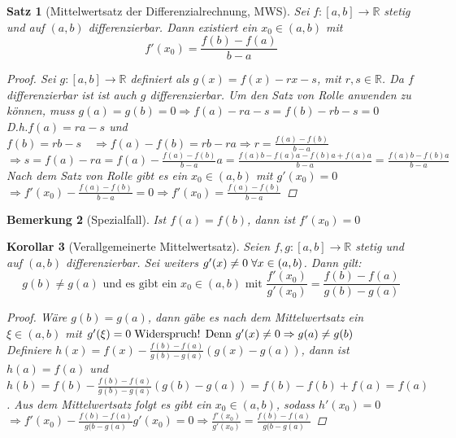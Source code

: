 \documentclass[a4paper,titlepage,oneside]{article}
\def\R{\ensuremath{\mathbb{R}} }
\def\WSP{\text{Widerspruch! }}
\def\sp{\hspace{0,1cm}}
\theoremstyle{thmstyle}
\newtheorem{satz}{Satz}[section]
\newtheorem{korr}[satz]{Korollar}
\newtheorem{bem}[satz]{Bemerkung}
\theoremstyle{subthmstyle}
\begin{document}
\begin{satz}[Mittelwertsatz der Differenzialrechnung, MWS]
Sei $f : [a,b] \to \R $ stetig und auf $(a,b)$ differenzierbar. Dann existiert ein $x_0 \in (a,b)$ mit \[f'(x_0) = \frac{f(b) - f(a)}{b-a}\]
\begin{proof}
Sei $g: [a,b]\to \R$ definiert als $g(x) = f(x) - rx - s$, mit $r,s \in \R$. Da $f$ differenzierbar ist ist auch $g$ differenzierbar. Um den Satz von Rolle anwenden zu können, muss $g(a) = g(b) = 0 \Rightarrow f(a) - r a - s = f(b) - r b - s = 0 $\\
D.h.$  f(a) = r a - s $ und $ f(b) = r b - s \quad \Rightarrow f(a) - f(b) = rb - ra \Rightarrow r = \frac{f(a) - f(b)}{b - a}$ \\
$\Rightarrow s = f(a) - ra = f(a) -  \frac{f(a) - f(b)}{b - a} a = \frac{f(a) b - f(a) a - f(b) a + f(a) a}{b-a} = \frac{f(a)b - f(b)a}{b - a}$\\
Nach dem Satz von Rolle gibt es ein $x_0 \in (a,b)$ mit $g'(x_0) = 0$\\
$\Rightarrow f'(x_0) -  \frac{f(a) - f(b)}{b - a} = 0 \Rightarrow f'(x_0) =  \frac{f(a) - f(b)}{b - a}$
\end{proof}
\end{satz}

\begin{bem}[Spezialfall]
Ist $f(a) = f(b)$, dann ist $f'(x_0) = 0$
\end{bem}

\begin{korr}[Verallgemeinerte Mittelwertsatz]
Seien $f,g:[a,b] \to \R$ stetig und auf $(a,b)$ differenzierbar. Sei weiters $g'(x) \ne 0 \sp \forall x \in (a,b)$. Dann gilt:
\[g(b) \ne g(a) \text{ und es gibt ein } x_0 \in (a,b) \text{ mit } \frac{f'(x_0)}{g'(x_0)} = \frac{f(b) - f(a)}{g(b) - g(a)}\]
\begin{proof}
Wäre $g(b) = g(a)$, dann gäbe es nach dem Mittelwertsatz ein $\xi \in (a,b)$ mit $g'(\xi) = 0 \sp \WSP \\
\text{Denn $g'(x) \ne 0$} \Rightarrow g(a) \ne g(b)$\\
Definiere $h(x)  = f(x) - \frac{f(b) - f(a)}{g(b) - g(a)}(g(x) - g(a))$, dann ist $h(a) = f(a)$ und $h(b) = f(b) - \frac{f(b) - f(a)}{g(b) - g(a)}(g(b) - g(a)) = f(b) - f(b) + f(a) = f(a)$. Aus dem Mittelwertsatz folgt es gibt ein $x_0 \in (a,b) $, sodass $h'(x_0) = 0 $  \\
$\Rightarrow  f'(x_0) - \frac{f(b) - f(a)}{g(b - g(a)}g'(x_0) = 0 \Rightarrow \frac{f'(x_0)}{g'(x_0)} = \frac{f(b) - f(a)}{g(b - g(a)}$
\end{proof}
\end{korr}
\end{document}
